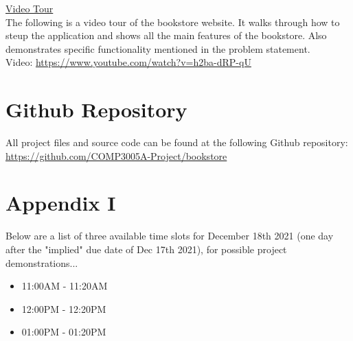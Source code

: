 \documentclass[a4 paper]{article}
\begin{document}
\noindent\underline{Video Tour}\\
The following is a video tour of the bookstore website. It walks through how to steup the application and shows all the main features of the bookstore. Also demonstrates specific functionality mentioned in the problem statement.\\

\noindent Video: \href{https://www.youtube.com/}{https://www.youtube.com/watch?v=h2ba-dRP-qU}\\

\section{Github Repository}
\noindent All project files and source code can be found at the following Github repository: \\
\href{https://github.com/COMP3005A-Project/bookstore}{https://github.com/COMP3005A-Project/bookstore}

\section{Appendix I}
Below are a list of three available time slots for December 18th 2021 (one day after the "implied" due date of Dec 17th 2021), for possible project demonstrations...
\begin{itemize}
	\item 11:00AM - 11:20AM
	\item 12:00PM - 12:20PM
	\item 01:00PM - 01:20PM
\end{itemize}
\end{document}

